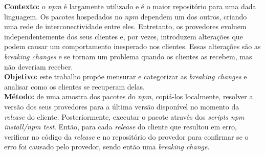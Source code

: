 \begin{resumo}

\textbf{Contexto:} o \textit{npm} é largamente utilizado e é o maior repositório para uma dada linguagem. Os pacotes hospedados no \textit{npm} dependem um dos outros, criando uma rede de interconectividade entre eles. Entretanto, os provedores evoluem independentemente dos seus clientes e, por vezes, introduzem alterações que podem causar um comportamento inesperado nos clientes. Essas alterações são as \textit{breaking changes} e se tornam um problema quando os clientes as recebem, mas não deveriam receber.\\
\textbf{Objetivo:} este trabalho propõe mensurar e categorizar as \textit{breaking changes} e analisar como os clientes se recuperam delas.\\
\textbf{Método:} de uma amostra dos pacotes do \textit{npm}, copiá-los localmente, resolver a versão dos seus provedores para a última versão disponível no momento da \textit{release} do cliente. Posteriormente, executar o pacote através dos \textit{scripts npm install/npm test}. Então, para cada \textit{release} do cliente que resultou em erro, verificar no código da \textit{release} e no repositório do provedor para confirmar se o erro foi causado pelo provedor, sendo então uma \textit{breaking change}.\\

\end{resumo}